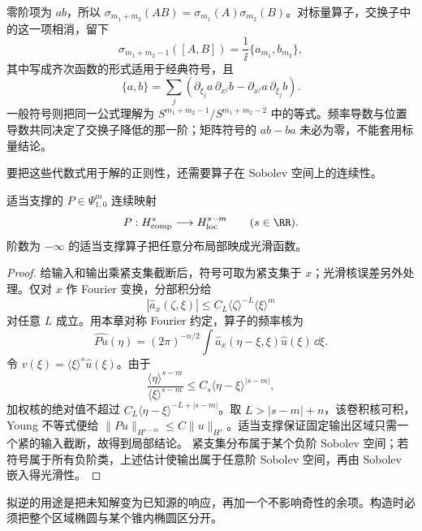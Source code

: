 零阶项为 $ab$，所以 $\sigma_{m_1+m_2}(AB)=\sigma_{m_1}(A)\sigma_{m_2}(B)$。对标量算子，交换子中的这一项相消，留下
\begin{equation}
\sigma_{m_1+m_2-1}([A,B])
=\frac1\ii\{a_{m_1},b_{m_2}\},
\label{eq:math-dist-commutator-poisson}
\end{equation}
其中写成齐次函数的形式适用于经典符号，且
\[
\{a,b\}=\sum_j
(\partial_{\xi_j}a\,\partial_{x^j}b
-\partial_{x^j}a\,\partial_{\xi_j}b).
\]
一般符号则把同一公式理解为 $S^{m_1+m_2-1}/S^{m_1+m_2-2}$ 中的等式。频率导数与位置导数共同决定了交换子降低的那一阶；矩阵符号的 $ab-ba$ 未必为零，不能套用标量结论。

要把这些代数式用于解的正则性，还需要算子在 Sobolev 空间上的连续性。

\begin{proposition}[局部 Sobolev 映射]
适当支撑的 $P\in\Psi^m_{1,0}$ 连续映射
\[
P:H^s_{\mathrm{comp}}\longrightarrow H^{s-m}_{\mathrm{loc}}
\qquad(s\in\RR).
\]
阶数为 $-\infty$ 的适当支撑算子把任意分布局部映成光滑函数。
\end{proposition}
\begin{proof}
给输入和输出乘紧支集截断后，符号可取为紧支集于 $x$；光滑核误差另外处理。仅对 $x$ 作 Fourier 变换，分部积分给
\[
|\widehat a_x(\zeta,\xi)|
\le C_L\langle\zeta\rangle^{-L}\langle\xi\rangle^m
\]
对任意 $L$ 成立。用本章对称 Fourier 约定，算子的频率核为
\[
\widehat{Pu}(\eta)=(2\pi)^{-n/2}
\int\widehat a_x(\eta-\xi,\xi)\widehat u(\xi)\,\dd\xi.
\]
令 $v(\xi)=\langle\xi\rangle^s\widehat u(\xi)$。由于
\[
\frac{\langle\eta\rangle^{s-m}}{\langle\xi\rangle^{s-m}}
\le C_s\langle\eta-\xi\rangle^{|s-m|},
\]
加权核的绝对值不超过 $C_L\langle\eta-\xi\rangle^{-L+|s-m|}$。取 $L>|s-m|+n$，该卷积核可积，Young 不等式便给 $\|Pu\|_{H^{s-m}}\le C\|u\|_{H^s}$。适当支撑保证固定输出区域只需一个紧的输入截断，故得到局部结论。
紧支集分布属于某个负阶 Sobolev 空间；若符号属于所有负阶类，上述估计使输出属于任意阶 Sobolev 空间，再由 Sobolev 嵌入得光滑性。
\end{proof}

拟逆的用途是把未知解变为已知源的响应，再加一个不影响奇性的余项。构造时必须把整个区域椭圆与某个锥内椭圆区分开。

